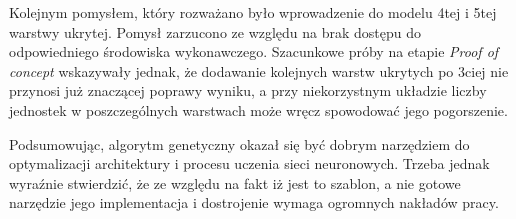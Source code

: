 \documentclass[a4paper,11pt]{article}
\begin{document}
    \bigskip

    Kolejnym pomysłem, który rozważano było wprowadzenie do modelu 4tej i 5tej warstwy ukrytej. Pomysł zarzucono ze względu na brak dostępu do odpowiedniego środowiska wykonawczego. Szacunkowe próby na etapie \textit{Proof of concept} wskazywały jednak, że dodawanie kolejnych warstw ukrytych po 3ciej nie przynosi już znaczącej poprawy wyniku, a przy niekorzystnym układzie liczby jednostek w poszczególnych warstwach może wręcz spowodować jego pogorszenie.

    \bigskip

    Podsumowując, algorytm genetyczny okazał się być dobrym narzędziem do optymalizacji architektury i procesu uczenia sieci neuronowych. Trzeba jednak wyraźnie stwierdzić, że ze względu na fakt iż jest to szablon, a nie gotowe narzędzie jego implementacja i dostrojenie wymaga ogromnych nakładów pracy.

    \newpage


    \printbibliography
\end{document}
